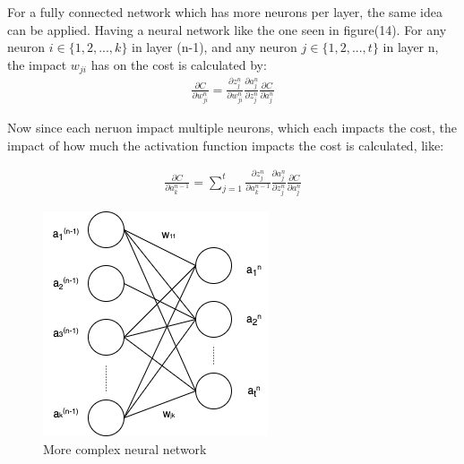 \noindent
For a fully connected network which has more neurons per layer, the same idea can be applied. Having a neural network like the one seen in figure(14). For any neuron $i \in \{1,2,...,k\}$ in layer (n-1), and any neuron $j \in \{1,2,...,t\}$ in layer n, the impact $w_{ji}$ has on the cost is calculated by: \\

\begin{align}
\frac{\partial C}{\partial w_{ji}^n} =\frac{\partial z_j^n}{\partial w_{ji}^n}\frac{\partial a_j^n}{\partial z_j^n}\frac{\partial C}{  \partial a_j^n}
\end{align}

\noindent
Now since each neruon impact multiple neurons, which each impacts the cost, the impact of how much the activation function impacts the cost is calculated, like:

\begin{align}
\frac{\partial C}{\partial a^{n-1}_k} = \sum^t_{j=1} \frac{\partial z_j^n}{\partial a_k^{n-1}}\frac{\partial a_j^n}{\partial z_j^n}\frac{\partial C}{  \partial a_j^n}
\end{align}

\begin{figure}[!ht]
  \centering
  \includegraphics[scale=0.4]{latex/imgs/multibackprop.png}
  \caption{More complex neural network}\label{Baseline:before}
\end{figure}
